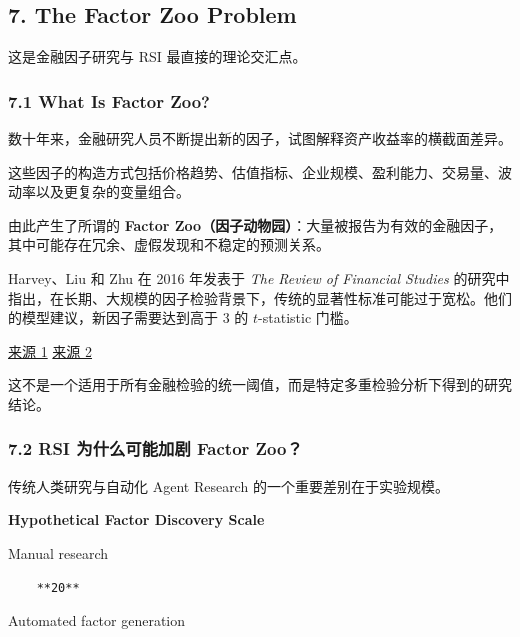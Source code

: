 \hypertarget{part-4-63-0001-the-factor-zoo-problem}{%
\subsection{7. The Factor Zoo Problem}\label{part-4-63-0001-the-factor-zoo-problem}}

这是金融因子研究与 RSI 最直接的理论交汇点。

\hypertarget{part-4-63-0001-what-is-factor-zoo}{%
\subsubsection{7.1 What Is Factor Zoo?}\label{part-4-63-0001-what-is-factor-zoo}}

数十年来，金融研究人员不断提出新的因子，试图解释资产收益率的横截面差异。

这些因子的构造方式包括价格趋势、估值指标、企业规模、盈利能力、交易量、波动率以及更复杂的变量组合。

由此产生了所谓的 \textbf{Factor Zoo（因子动物园）}：大量被报告为有效的金融因子，其中可能存在冗余、虚假发现和不稳定的预测关系。

Harvey、Liu 和 Zhu 在 2016 年发表于 \emph{The Review of Financial Studies} 的研究中指出，在长期、大规模的因子检验背景下，传统的显著性标准可能过于宽松。他们的模型建议，新因子需要达到高于 3 的 \(t\)-statistic 门槛。

\href{https://academic.oup.com/rfs/article-abstract/29/1/5/1843824?login=false}{来源 1} \href{https://www.nber.org/papers/w20592}{来源 2}

这不是一个适用于所有金融检验的统一阈值，而是特定多重检验分析下得到的研究结论。

\hypertarget{part-4-63-0001-rsi-ux4e3aux4ec0ux4e48ux53efux80fdux52a0ux5267-factor-zoo}{%
\subsubsection{7.2 RSI 为什么可能加剧 Factor Zoo？}\label{part-4-63-0001-rsi-ux4e3aux4ec0ux4e48ux53efux80fdux52a0ux5267-factor-zoo}}

传统人类研究与自动化 Agent Research 的一个重要差别在于实验规模。

\textbf{Hypothetical Factor Discovery Scale}

Manual research

\begin{verbatim}
    **20**
\end{verbatim}

Automated factor generation


